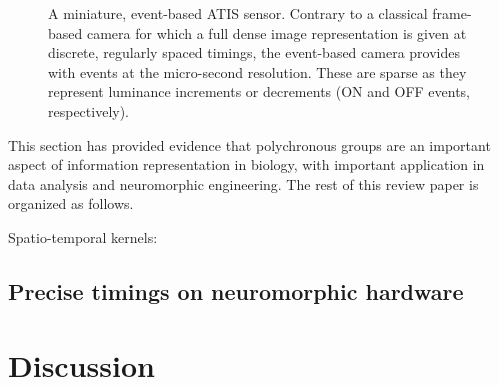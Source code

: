 \documentclass[brainsci, %
               review,submit,pdftex,moreauthors
               ]{Definitions/mdpi}
\begin{document}
\begin{figure}
\centering
\caption{A miniature, event-based ATIS sensor. Contrary to a classical frame-based camera for which a full dense image representation is given at discrete, regularly spaced timings, the event-based camera provides with events at the micro-second resolution. These are sparse as they represent luminance increments or decrements (ON and OFF events, respectively).}\label{fig:silicon_retina}
\end{figure}
This section has provided evidence that polychronous groups are an important aspect of information representation in biology, with important application in data analysis and neuromorphic engineering. The rest of this review paper is organized as follows.


Spatio-temporal kernels:~\citep{yu_stsc-snn_2022}


\subsection{Precise timings on neuromorphic hardware}


 
 
 
 



\section{Discussion}\label{sec:discussion}
\end{document}
